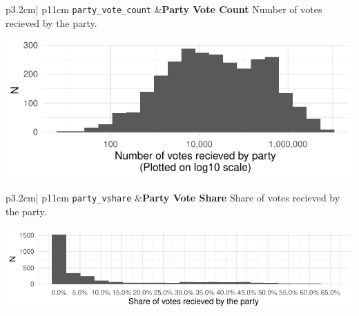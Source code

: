 \documentclass[
]{article}
\begin{document}
\begin{longtable}{p{3.2cm}| p{11cm}}
\texttt{party\_vote\_count} &\textbf{Party Vote Count}\newline 
Number of votes recieved by the party.

\hspace*{.25cm}
\begin{minipage}[t]{\linewidth }
\vspace{0pt}
\includegraphics[width = \linewidth]{cbelec/pvcplot.pdf}
\end{minipage}


\end{longtable}

\begin{longtable}{p{3.2cm}| p{11cm}}
\texttt{party\_vshare} &\textbf{Party Vote Share}\newline 
Share of votes recieved by the party.

\hspace*{.25cm}
\begin{minipage}[t]{\linewidth }
\vspace{0pt}
\includegraphics[width = \linewidth]{cbelec/pvsplot.pdf}
\end{minipage}


\end{longtable}
\end{document}
